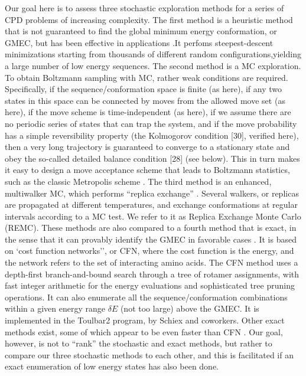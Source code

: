 Our goal here is to assess three stochastic exploration methods for a series of CPD problems of increasing complexity.
The first method is a heuristic method that is not guaranteed to find the global minimum energy conformation, or GMEC,
but has been effective in applications \cite{Wernisch00,Schmidt09,Schmidt10}.It perfoms steepest-descent minimizations starting from thousands of different random configurations,yielding a large number of low energy sequences.
The second method is a MC exploration.
To obtain Boltzmann sampling with MC, rather weak conditions are required.
Specifically, if the sequence/conformation space is finite (as here), if any two states in this space can be connected by moves from the allowed move set (as here), if the move scheme is time-independent (as here), if we assume there are no periodic series of states that can trap the system, and if the move probability has a simple reversibility property (the Kolmogorov condition [30], verified here), then a very long trajectory is guaranteed to converge to a stationary state and obey the so-called detailed balance condition [28] (see below).
This in turn makes it easy to design a move acceptance scheme that leads to Boltzmann statistics, such as the classic Metropolis scheme \cite{Metropolis53,FrenkelBK}.
The third method is an enhanced, multiwalker MC, which performs ``replica exchange'' \cite{Sugita99,Kofke02,Earl05}.
Several walkers, or replicas are propagated at different temperatures, and exchange conformations at regular intervals according to a MC test.
We refer to it as Replica Exchange Monte Carlo (REMC).
These methods are also compared to a fourth method that is exact, in the sense that it can provably identify the GMEC in favorable cases \cite{Traore13,Allouche14}.
It is based on `cost function networks'', or CFN, where the cost function is the energy, and the network refers to the set of interacting amino acids.
The CFN method uses a depth-first branch-and-bound search through a tree of rotamer assignments, with fast integer arithmetic for the energy evaluations and sophisticated tree pruning operations.
It can also enumerate all the sequence/conformation combinations within a given energy range $\delta E$ (not too large) above the GMEC.
It is implemented in the Toulbar2 program, by Schiex and coworkers.
Other exact methods exist, some of which appear to be even faster than CFN \cite{Hong09}.
Our goal, however, is not to ``rank'' the stochastic and exact methods, but rather to compare our three stochastic methods to each other, and this is facilitated if an exact enumeration of low energy states has also been done.

